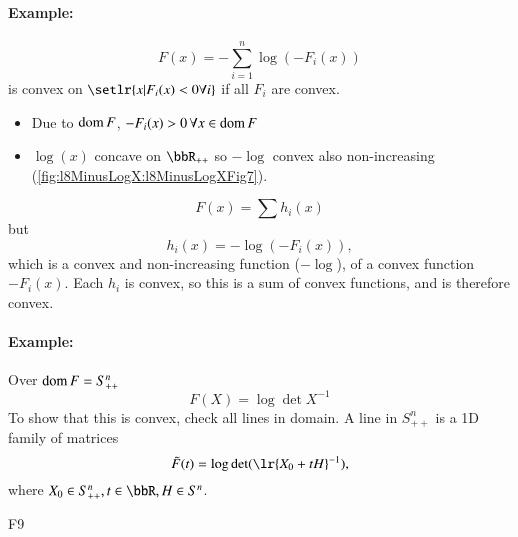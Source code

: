 \paragraph{Example:}
%
\begin{equation}\label{eqn:convexOptimizationLecture8:300}
F(x) = - \sum_{i = 1}^n \log( -F_i(x) )
\end{equation}
%
is convex on \( \setlr{ x | F_i(x) < 0 \forall i } \) if all \( F_i \) are convex.

\begin{itemize}
\item Due to \( \operatorname{dom} F \), \( -F_i(x) > 0 \,\forall x \in \operatorname{dom} F \)
\item \( \log(x) \) concave on \( \bbR_{++} \) so \( -\log \) convex also non-increasing (\cref{fig:l8MinusLogX:l8MinusLogXFig7}).


\end{itemize}
%
\begin{equation}\label{eqn:convexOptimizationLecture8:320}
F(x) = \sum h_i(x)
\end{equation}
%
but
\begin{equation}\label{eqn:convexOptimizationLecture8:340}
h_i(x) = -\log(-F_i(x)),
\end{equation}
%
which is a convex and non-increasing function (\(-\log\)), of a convex function \( -F_i(x) \).  Each 
\( h_i \) is convex, so this is a sum of convex functions, and is therefore convex.

\paragraph{Example:}

Over \( \operatorname{dom} F = S^n_{++} \)
%
\begin{equation}\label{eqn:convexOptimizationLecture8:360}
F(X) = \log \det X^{-1}
\end{equation}
%
To show that this is convex, check all lines in domain.  A line in \( S^n_{++} \) is a 1D family of matrices
%
\begin{equation}\label{eqn:convexOptimizationLecture8:380}
\tilde{F}(t) = \log \det( \lr{X_0 + t H}^{-1} ),
\end{equation}
%
where \( X_0 \in S^n_{++}, t \in \bbR, H \in S^n \).

F9

